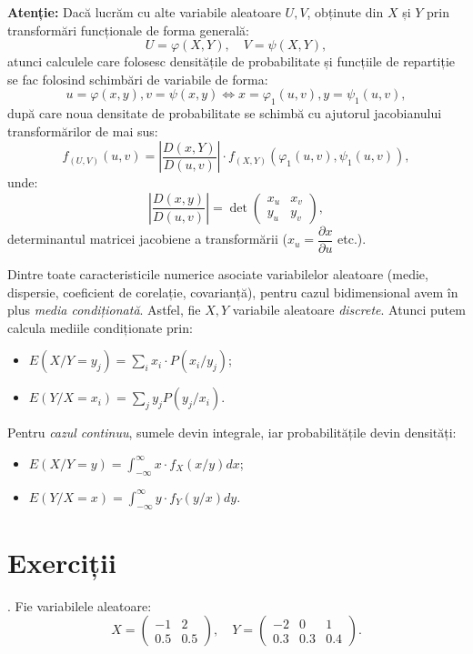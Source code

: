 \textbf{Atenție:} Dacă lucrăm cu alte variabile aleatoare $ U, V $, obținute
din $ X $ și $ Y $ prin transformări funcționale de forma generală:
\[
  U = \varphi(X, Y), \quad V = \psi(X, Y),
\]
atunci calculele care folosesc densitățile de probabilitate și funcțiile
de repartiție se fac folosind schimbări de variabile de forma:
\[
  u = \varphi(x, y), v = \psi(x, y) \Leftrightarrow %
  x = \varphi_1(u, v), y = \psi_1(u,v),
\]
după care noua densitate de probabilitate se schimbă cu ajutorul jacobianului
transformărilor de mai sus:
\[
  f_{(U, V)}(u,v) = \left| \dfrac{D(x, Y)}{D(u,v)} \right| \cdot %
  f_{(X, Y)}(\varphi_1(u,v), \psi_1(u, v)),
\]
unde:
\[
  \left| \dfrac{D(x, y)}{D(u,v)} \right| = \det %
  \begin{pmatrix}
    x_u & x_v \\
    y_u & y_v
  \end{pmatrix},
\]
determinantul matricei jacobiene a transformării ($ x_u = \dfrac{\partial x}{\partial u} $
etc.).

\vspace{0.3cm}

Dintre toate caracteristicile numerice asociate variabilelor aleatoare
(medie, dispersie, coeficient de corelație, covarianță), pentru cazul
bidimensional avem în plus \emph{media condiționată}. Astfel, fie $ X, Y $
variabile aleatoare \emph{discrete}. Atunci putem calcula mediile condiționate
prin:
\begin{itemize}
\item $ E(X / Y = y_j) = \sum_i x_i \cdot P(x_i / y_j) $;
\item $ E(Y / X = x_i) = \sum_j y_j P(y_j / x_i) $.
\end{itemize}

Pentru \emph{cazul continuu}, sumele devin integrale, iar probabilitățile
devin densități:
\begin{itemize}
\item $ E(X / Y = y) = \int_{-\infty}^\infty x \cdot f_X(x/y) dx $;
\item $ E(Y / X = x) = \int_{-\infty}^\infty y \cdot f_Y(y/x) dy $.
\end{itemize}

\section{Exerciții}

\indent{}. Fie variabilele aleatoare:
\[
  X = \begin{pmatrix}
    -1 & 2 \\
    0.5 & 0.5
  \end{pmatrix}, \quad
  Y = \begin{pmatrix}
    -2 & 0 & 1 \\
    0.3 & 0.3 & 0.4
  \end{pmatrix}.
\]

